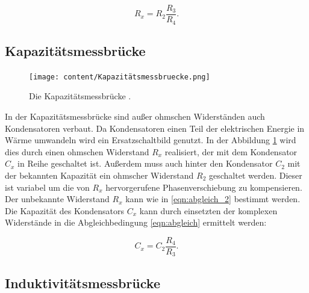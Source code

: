 \begin{equation}
    R_x = R_2 \frac{R_3}{R_4}.
    \label{eqn:abgleich_2}
\end{equation}

\subsection{Kapazitätsmessbrücke}

\begin{figure}
    \centering
    \texttt{[image: content/Kapazitätsmessbruecke.png]}
    \caption{Die Kapazitätsmessbrücke \cite[S. 220]{anleitung}.}
     \label{fig:kapaz}
\end{figure}

In der Kapazitätsmessbrücke sind außer ohmschen Widerständen auch Kondensatoren verbaut.
Da Kondensatoren einen Teil der elektrischen Energie in Wärme umwandeln wird ein Ersatzschaltbild genutzt.
In der Abbildung \ref{fig:kapaz} wird dies durch einen ohmschen Widerstand $R_x$ realisiert, der mit dem Kondensator $C_x$ in Reihe geschaltet ist.
Außerdem muss auch hinter den Kondensator $C_2$ mit der bekannten Kapazität ein ohmscher Widerstand $R_2$ geschaltet werden.
Dieser ist variabel um die von $R_x$ hervorgerufene Phasenverschiebung zu kompensieren.
Der unbekannte Widerstand $R_x$ kann wie in \eqref{eqn:abgleich_2} bestimmt werden.
Die Kapazität des Kondensators $C_x$ kann durch einsetzten der komplexen Widerstände in die
Abgleichbedingung \eqref{eqn:abgleich} ermittelt werden:

\begin{equation}
    C_x = C_2 \frac{R_4}{R_3}.
    \label{eqn:kapc}
\end{equation}

\subsection{Induktivitätsmessbrücke}

